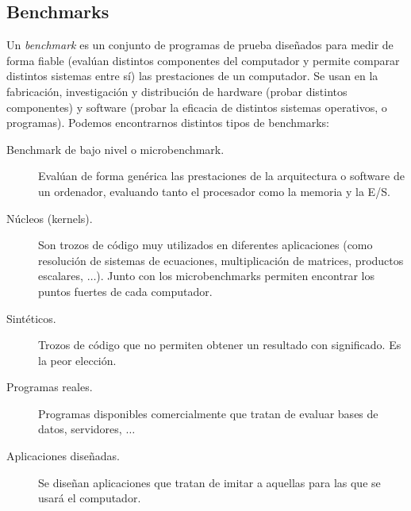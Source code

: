 \subsection{Benchmarks}
Un \emph{benchmark} es un conjunto de programas de prueba diseñados para medir de forma fiable (evalúan distintos componentes del computador y permite comparar distintos sistemas entre sí) las prestaciones de un computador. Se usan en la fabricación, investigación y distribución de hardware (probar distintos componentes) y software (probar la eficacia de distintos sistemas operativos, o programas). Podemos encontrarnos distintos tipos de benchmarks:

\begin{description}
    \item [Benchmark de bajo nivel o microbenchmark.]
        Evalúan de forma genérica las prestaciones de la arquitectura o software de un ordenador, evaluando tanto el procesador como la memoria y la E/S.
    \item [Núcleos (kernels).]
        Son trozos de código muy utilizados en diferentes aplicaciones (como resolución de sistemas de ecuaciones, multiplicación de matrices, productos escalares, $\ldots$). Junto con los microbenchmarks permiten encontrar los puntos fuertes de cada computador.
    \item [Sintéticos.]
        Trozos de código que no permiten obtener un resultado con significado. Es la peor elección.
    \item [Programas reales.]
        Programas disponibles comercialmente que tratan de evaluar bases de datos, servidores, $\ldots$
    \item [Aplicaciones diseñadas.]
        Se diseñan aplicaciones que tratan de imitar a aquellas para las que se usará el computador. 
\end{description}

